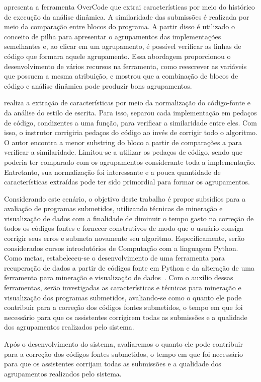 	 apresenta a ferramenta OverCode que extrai características
	por meio do histórico de execução da análise dinâmica. A similaridade das submissões
	é realizada por meio da comparação entre blocos do programa. A partir disso é utilizado
	o conceito de pilha para apresentar o agrupamentos das implementações semelhantes e,
	ao clicar em um agrupamento, é possível verificar as linhas de código que formara
	aquele agrupamento. Essa abordagem proporcionou o desenvolvimento de vários recursos
	na ferramenta, como reescrever as variáveis que possuem a mesma atribuição, e mostrou
	que a combinação de blocos de código e análise dinâmica pode produzir bons agrupamentos.
	
	 realiza a extração de características por meio da normalização
	do código-fonte e da análise do estilo de escrita. Para isso, separou cada implementação
	em pedaços de código, condizentes a uma função, para verificar a similaridade entre eles.
	Com isso, o instrutor corrigiria pedaços do código ao invés de corrigir todo o algoritmo.
	O autor encontra a menor substring do bloco a partir de comparações  a
	 para verificar a similaridade. Limitou-se a utilizar os pedaços de
	código, sendo que poderia ter comparado com os agrupamentos considerante toda a
	implementação. Entretanto, sua normalização foi interessante e a pouca quantidade de
	características extraídas pode ter sido primordial para formar os agrupamentos.
	
	
	Considerando este cenário, o objetivo deste trabalho é propor subsídios para a
	avaliação de programas submetidos, utilizando técnicas de mineração e visualização
	de dados com a finalidade de diminuir o tempo gasto na correção de todos os códigos
	fontes e  fornecer  construtivos de modo que o usuário consiga
	corrigir seus erros e submeta novamente seu algoritmo. Especificamente, serão
	considerados cursos introdutórios de Computação com a linguagem Python. Como
	metas, estabeleceu-se o desenvolvimento de uma ferramenta para recuperação de
	dados a partir de códigos fonte em Python e da alteração de uma ferramenta para
	mineração e visualização de dados~\cite{Alencar}. Com o auxílio dessas ferramentas,
	serão investigadas as características e técnicas para mineração e visualização
	dos programas submetidos, avaliando-se como o quanto ele pode contribuir para
	a correção dos códigos fontes submetidos, o tempo em que foi necessário para
	que os assistentes corrigirem todas as submissões e a qualidade dos agrupamentos
	realizados pelo sistema.
	
	Após o desenvolvimento do sistema, avaliaremos o quanto ele pode contribuir para
	a correção dos códigos fontes submetidos, o tempo em que foi necessário para que
	os assistentes corrijam todas as submissões e a qualidade dos agrupamentos
	realizados pelo sistema.
